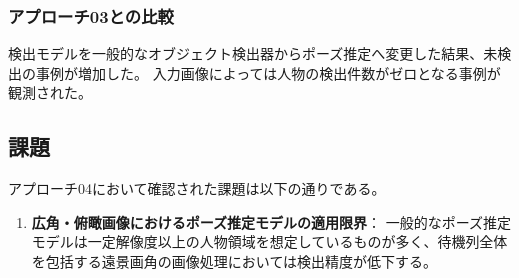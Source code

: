 \subsubsection{アプローチ03との比較}
検出モデルを一般的なオブジェクト検出器からポーズ推定へ変更した結果、未検出の事例が増加した。
入力画像によっては人物の検出件数がゼロとなる事例が観測された。

\subsection{課題}
アプローチ04において確認された課題は以下の通りである。

\begin{enumerate}
    \item \textbf{広角・俯瞰画像におけるポーズ推定モデルの適用限界}：
    一般的なポーズ推定モデルは一定解像度以上の人物領域を想定しているものが多く、待機列全体を包括する遠景画角の画像処理においては検出精度が低下する。
\end{enumerate}

\clearpage
